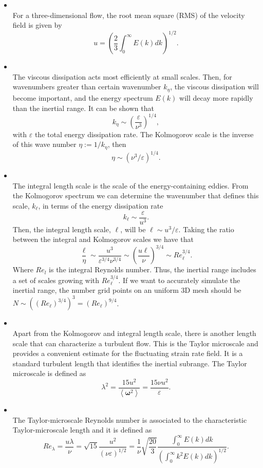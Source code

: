 \begin{itemize}
\item{}\\ For a three-dimensional flow, the root mean square (RMS) of the velocity field is given by
$$u=\left(\frac{2}{3}\int_0^\infty E(k)dk\right)^{1/2}.$$
\item{}\\The viscous dissipation acts most efficiently at small scales. Then, for wavenumbers greater than certain wavenumber $k_\eta$, the viscous dissipation will become important, and the energy spectrum $E(k)$ will decay more rapidly than the inertial range. It can be shown that $$k_\eta\sim\left(\frac{\varepsilon}{\nu^3}\right)^{1/4},$$ with $\varepsilon$ the total energy dissipation rate. The Kolmogorov scale is the inverse of this wave number $\eta:=1/k_\eta$, then $$\eta\sim\left(\nu^3/\varepsilon\right)^{1/4}.$$
\item{}\\The integral length scale is the scale of the energy-containing eddies. From the Kolmogorov spectrum  we can determine the wavenumber that defines this scale, $k_\ell$, in terms of the energy dissipation rate  $$k_\ell\sim\frac{\varepsilon}{u^3}.$$ Then, the integral length scale, $\ell$, will be $\ell\sim u^3/\varepsilon$. Taking the ratio between the integral and Kolmogorov scales we have that
$$\frac{\ell}{\eta}\sim\frac{u^3}{\varepsilon^{3/4}\nu^{3/4}}\sim\left(\frac{u\ell}{\nu}\right)^{3/4}\sim Re_\ell^{3/4}.$$
Where $Re_l$ is the integral Reynolds number. Thus, the inertial range includes a set of scales growing with $Re_\ell^{3/4}$. If we want to accurately simulate the inertial range, the number grid points on an uniform 3D mesh should be $N\sim\left((Re_\ell)^{3/4}\right)^3=(Re_\ell)^{9/4}$. 
\item{}\\Apart from the Kolmogorov and integral length scale, there is another length scale that can characterize a turbulent flow. This is the Taylor microscale and provides a convenient estimate for the fluctuating strain rate field. It is a standard turbulent length that identifies the inertial subrange. The Taylor microscale is defined as $$\lambda^2=\frac{15u^2}{\left\langle\boldsymbol{\omega}^2\right\rangle}=\frac{15\nu u^2}{\varepsilon}.$$
\item{}\\The Taylor-microscale Reynolds number is associated to the characteristic Taylor-microscale length and it is defined as $$Re_\lambda=\frac{u\lambda}{\nu}=\sqrt{15}\frac{u^2}{\left(\nu\varepsilon\right)^{1/2}}=\frac{1}{\nu}\sqrt{\frac{20}{3}}\frac{\int_0^\infty E(k)dk}{\left(\int_0^\infty k^2E(k)dk\right)^{1/2}}.$$

\end{itemize}
